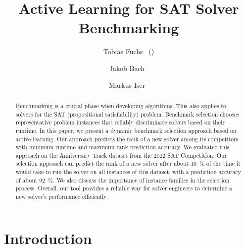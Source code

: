 \documentclass[runningheads]{llncs}
\begin{document}
\title{Active Learning for SAT Solver Benchmarking}

\author{
  Tobias Fuchs~ (\Letter) \and
  Jakob Bach~ \and
  Markus Iser~
}



\maketitle

\begin{abstract}
  Benchmarking is a crucial phase when developing algorithms.
  This also applies to solvers for the SAT (propositional satisfiability) problem.
  Benchmark selection chooses representative problem instances that reliably discriminate solvers based on their runtime.
  In this paper, we present a dynamic benchmark selection approach based on active learning.
  Our approach predicts the rank of a new solver among its competitors with minimum runtime and maximum rank prediction accuracy.
  We evaluated this approach on the Anniversary Track dataset from the 2022 SAT Competition.
  Our selection approach can predict the rank of a new solver after about \SI{10}{\%} of the time it would take to run the solver on all instances of this dataset, with a prediction accuracy of about \SI{92}{\%}. 
  We also discuss the importance of instance families in the selection process. 
  Overall, our tool provides a reliable way for solver engineers to determine a new solver's performance efficiently.

\end{abstract}


\section{Introduction}
\label{sec:intro}
\end{document}
